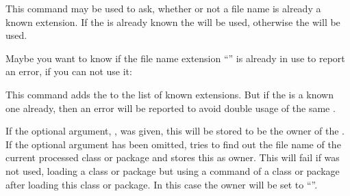 \begin{Declaration}
\end{Declaration}
This command may be used to ask, whether or not a file name 
is already a known extension.  If the  is already known the
 will be used, otherwise the  will be used.
\begin{Example}
  Maybe you want to know if the file name extension ``'' is already
  in use to report an error, if you can not use it:
\begin{lstcode}
\end{lstcode}
\end{Example}
\EndIndexGroup


\begin{Declaration}
\end{Declaration}
This command adds the  to the list of known extensions. But
if the  is a known one already, then an error will be
reported to avoid double usage of the same .

If the optional argument, , was given, this 
will be stored to be the owner of the .  If the optional
argument has been omitted,  tries to find out the file name
of the current processed class or package and stores this as owner.
This will fail if  was not used,
loading a class or package but using a command of a class or package after
loading this class or package.  In this case the owner will be set to
``''.

